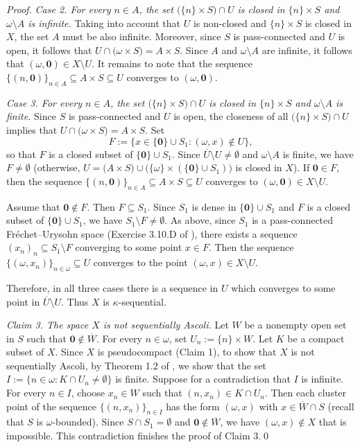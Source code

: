 \documentclass[preprint,11pt]{elsarticle}
\numberwithin{equation}{section}
\numberwithin{theorem}{section}
\newcommand{\w}{\omega}
\newcommand{\SM}{{\setminus}}
\begin{document}
\begin{proof}
{\em Case 2. For every $n\in A$, the set $\big(\{n\}\times  S\big)\cap U$ is closed in $\{n\}\times  S$ and $\w\SM A$ is infinite.} Taking into account that $U$ is non-closed and  $\{n\}\times  S$ is closed in $X$, the set $A$ must be also infinite. Moreover, since $S$ is pass-connected and $U$ is open, it follows that $U\cap\big(\w\times S\big)=A\times S$. Since $A$ and $\w\SM A$ are infinite, it follows that $(\w,\mathbf{0})\in X\setminus U$. It remains to note that the sequence $\{(n,\mathbf{0})\}_{n\in A} \subseteq A\times S \subseteq U$ converges to $(\w,\mathbf{0})$.
\smallskip

{\em Case 3. For every $n\in A$, the set $\big(\{n\}\times  S\big)\cap U$ is closed in $\{n\}\times  S$ and $\w\SM A$ is finite.} Since $S$ is pass-connected  and $U$ is open, the closeness of all $\big(\{n\}\times  S\big)\cap U$ implies that $U\cap\big(\w\times S\big)=A\times S$. Set
\[
F:=\big\{x\in \{\mathbf{0}\}\cup S_1: (\w,x)\notin U\big\},
\]
so that $F$ is a closed subset of $\{\mathbf{0}\}\cup S_1$. Since $\overline{U}\SM U\not=\emptyset$ and $\w\SM A$ is finite, we have $F\not=\emptyset$ (otherwise, $U=\big(A\times S\big) \cup \big( \{\w\}\times  (\{\mathbf{0}\}\cup S_1)\big)$ is closed in $X$). If $\mathbf{0}\in F$, then the sequence $\{(n,\mathbf{0})\}_{n\in A} \subseteq A\times S \subseteq U$ converges to $(\w,\mathbf{0})\in X\SM U$.

Assume that $\mathbf{0}\not\in F$. Then $F\subseteq S_1$. Since $S_1$ is dense in $\{\mathbf{0}\}\cup S_1$ and $F$ is a closed subset of $\{\mathbf{0}\}\cup S_1$, we have $S_1\setminus F\neq\emptyset$. As above, since $S_1$ is a pass-connected Fr\'{e}chet--Urysohn space (Exercise 3.10.D of \cite{Eng}), there exists a sequence $(x_n)_n\subseteq S_1\setminus F$ converging to some point $x\in F$. Then the sequence $\{(\w,x_n)\}_{n\in\w}\subseteq U$ converges to the point $(\w,x)\in X\setminus U$.

Therefore, in all three cases there is a sequence in $U$ which converges to some point in $\overline{U}\SM U$. Thus $X$ is $\kappa$-sequential.
\smallskip

{\em Claim 3. The space $X$ is not sequentially Ascoli.} Let $W$ be a nonempty open set in $S$ such that $\mathbf{0}\notin \overline{W}$. For every $n\in\w$, set $U_n:=\{n\}\times W$. Let $K$ be a compact subset of $X$. Since $X$ is pseudocompact (Claim 1), to show that $X$ is not sequentially Ascoli, by Theorem 1.2 of \cite{Gabr-pseudo-Ascoli}, we show that the set $I:=\{n\in\w: K\cap U_n\not=\emptyset\}$ is finite. Suppose for a contradiction that $I$ is infinite. For every $n\in I$, choose $x_n\in W$ such that $(n,x_n)\in K\cap U_n$. Then each cluster point of the sequence $\{(n,x_n)\}_{n\in I}$ has the form $(\w,x)$ with $x\in \overline{W}\cap S$ (recall that $S$ is $\w$-bounded). Since $S\cap S_1=\emptyset$ and $\mathbf{0}\notin \overline{W}$,  we have  $(\w,x)\notin X$ that is impossible. This contradiction finishes the proof of Claim 3.\qed
\end{proof}
\end{document}
